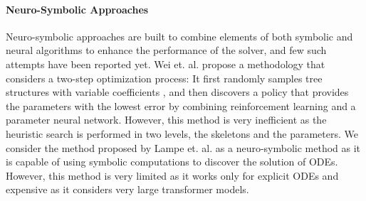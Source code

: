 \paragraph{Neuro-Symbolic Approaches} Neuro-symbolic approaches are built to combine elements of both symbolic and neural algorithms to enhance the performance of the solver, and few such attempts have been reported yet. Wei et. al. \cite{wei2024closed} propose a methodology that considers a two-step optimization process: It first randomly samples tree structures with variable coefficients \cite{dsr}, and then discovers a policy that provides the parameters with the lowest error by combining reinforcement learning and a parameter neural network. However, this method is very inefficient as the heuristic search is performed in two levels, the skeletons and the parameters. We consider the method proposed by Lampe et. al. \cite{lample2019deep} as a neuro-symbolic method as it is capable of using symbolic computations to discover the solution of ODEs. However, this method is very limited as it works only for explicit ODEs and expensive as it considers very large transformer models.